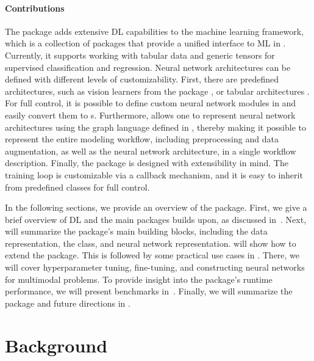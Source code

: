 \documentclass[article]{jss}
\theoremstyle{definition}
\begin{document}
\paragraph{Contributions} The  package adds extensive DL capabilities to the \mlrt{} machine learning framework, which is a collection of \rlang{} packages that provide a unified interface to ML in \rlang{}.
Currently, it supports working with tabular data and generic tensors for supervised classification and regression.
Neural network architectures can be defined with different levels of customizability.
First, there are predefined architectures, such as vision learners from the  \rlang{} package \citep{ref-r-torchvision}, or tabular architectures \citep{gorishniy2021revisiting}.
For full control, it is possible to define custom neural network modules in \rlang{} \torch{} and easily convert them to \mlrt{} s.
Furthermore, \mlrttorch{} allows one to represent neural network architectures using the graph language defined in \mlrtpipelines{}, thereby making it possible to represent the entire modeling workflow, including preprocessing and data augmentation, as well as the neural network architecture, in a single workflow description.
Finally, the package is designed with extensibility in mind. The training loop is customizable via a callback mechanism, and it is easy to inherit from predefined classes for full control.

In the following sections, we provide an overview of the package. First, we give a brief overview of DL and the main \rlang{} packages \mlrttorch{} builds upon, as discussed in~.
Next,  will summarize the package's main building blocks, including the data representation, the  class, and neural network  representation.
 will show how to extend the package. This is followed by some practical use cases in .
There, we will cover hyperparameter tuning, fine-tuning, and constructing neural networks for multimodal problems.
To provide insight into the package's runtime performance, we will present benchmarks in~.
Finally, we will summarize the package and future directions in .

\section{Background}\label{sec:background}
\end{document}
